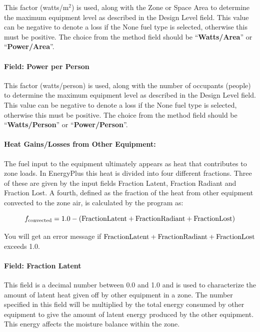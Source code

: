 This factor (watts/m\(^{2}\)) is used, along with the Zone or Space Area to determine the maximum equipment level as described in the Design Level field. This value can be negative to denote a loss if the None fuel type is selected, otherwise this must be positive. The choice from the method field should be ``\textbf{Watts/Area}'' or ``\textbf{Power/Area}''.

\paragraph{Field: Power per Person}\label{field-power-per-person-3}

This factor (watts/person) is used, along with the number of occupants (people) to determine the maximum equipment level as described in the Design Level field. This value can be negative to denote a loss if the None fuel type is selected, otherwise this must be positive. The choice from the method field should be ``\textbf{Watts/Person}'' or ``\textbf{Power/Person}''.

\paragraph{Heat Gains/Losses from Other Equipment:}\label{heat-gainslosses-from-other-equipment}

The fuel input to the equipment ultimately appears as heat that contributes to zone loads. In EnergyPlus this heat is divided into four different fractions. Three of these are given by the input fields Fraction Latent, Fraction Radiant and Fraction Lost. A fourth, defined as the fraction of the heat from other equipment convected to the zone air, is calculated by the program as:

\begin{equation}
  f_{\rm{convected}} = 1.0 - (\rm{Fraction Latent} + \rm{Fraction Radiant} + \rm{Fraction Lost})
\end{equation}

You will get an error message if \(\rm{Fraction Latent} + \rm{Fraction Radiant} + \rm{Fraction Lost}\) exceeds 1.0.

\paragraph{Field: Fraction Latent}\label{field-fraction-latent-4}

This field is a decimal number between 0.0 and 1.0 and is used to characterize the amount of latent heat given off by other equipment in a zone. The number specified in this field will be multiplied by the total energy consumed by other equipment to give the amount of latent energy produced by the other equipment. This energy affects the moisture balance within the zone.

